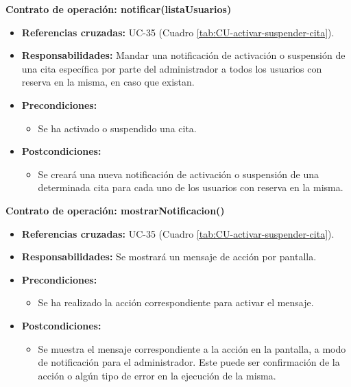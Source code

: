 \textbf{Contrato de operación: notificar(listaUsuarios)}
\begin{itemize}
\item \textbf{Referencias cruzadas:} UC-35 (Cuadro \ref{tab:CU-activar-suspender-cita}).
\item \textbf{Responsabilidades:} Mandar una notificación de activación o suspensión de una cita específica por parte del administrador a todos los usuarios con reserva en la misma, en caso que existan.
\item \textbf{Precondiciones:} 
 \begin{itemize}
\item Se ha activado o suspendido una cita.
\end {itemize}
\item \textbf{Postcondiciones:} 
 \begin{itemize}
\item Se creará una nueva notificación de activación o suspensión de una determinada cita para cada uno de los usuarios con reserva en la misma.
\end {itemize}
\end {itemize}

\textbf{Contrato de operación: mostrarNotificacion()}
\begin{itemize}
\item \textbf{Referencias cruzadas:} UC-35 (Cuadro \ref{tab:CU-activar-suspender-cita}).
\item \textbf{Responsabilidades:} Se mostrará un mensaje de acción por pantalla.
\item \textbf{Precondiciones:} 
 \begin{itemize}
\item Se ha realizado la acción correspondiente para activar el mensaje.
\end {itemize}
\item \textbf{Postcondiciones:} 
 \begin{itemize}
\item Se muestra el mensaje correspondiente a la acción en la pantalla, a modo de notificación para el administrador. Este puede ser confirmación de la acción o algún tipo de error en la ejecución de la misma.
\end {itemize}
\end {itemize}


\vspace{10mm}

